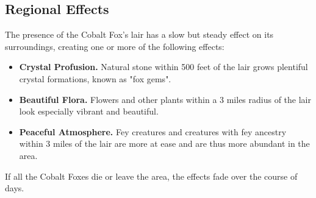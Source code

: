 \subsection*{Regional Effects}
The presence of the Cobalt Fox's lair has a slow but steady effect on its surroundings, creating one or more of the following effects:
\begin{itemize}
	\item \textbf{Crystal Profusion.} Natural stone within 500 feet of the lair grows plentiful crystal formations, known as "fox gems".
	\item \textbf{Beautiful Flora.} Flowers and other plants within a 3 miles radius of the lair look especially vibrant and beautiful.
	\item \textbf{Peaceful Atmosphere.} Fey creatures and creatures with fey ancestry within 3 miles of the lair are more at ease and are thus more abundant in the area.
\end{itemize}
If all the Cobalt Foxes die or leave the area, the effects fade over the course of  days.

\vfill\eject

